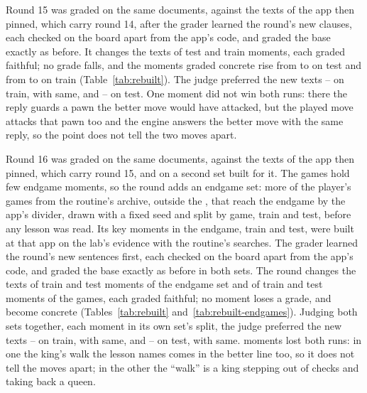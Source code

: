 \documentclass[11pt]{article}
\begin{document}
Round 15 was graded on the same documents, against the texts of the app then pinned, which carry round 14,
after the grader learned the round's new clauses, each checked on the board apart from the app's
code, and graded the base exactly as before. It changes the texts of \RoundFifteenChangedTest{}
test and \RoundFifteenChangedTrain{} train moments, each graded faithful; no grade falls, and the
moments graded concrete rise from \RoundFifteenConcreteBaseTest{} to \RoundFifteenConcreteTest{}
on test and from \RoundFifteenConcreteBaseTrain{} to \RoundFifteenConcreteTrain{} on train
(Table~\ref{tab:rebuilt}). The judge preferred the new texts
\RoundFifteenTrainNew--\RoundFifteenTrainOld{} on train, with \RoundFifteenTrainSame{} same, and
\RoundFifteenTestNew--\RoundFifteenTestOld{} on test. One moment did not win both runs: there the
reply guards a pawn the better move would have attacked, but the played move attacks that pawn too
and the engine answers the better move with the same reply, so the point does not tell the two
moves apart.

Round 16 was graded on the same documents, against the texts of the app then pinned, which carry round 15,
and on a second set built for it. The \Games{} games hold few endgame moments, so the round adds an
endgame set: \EndgameGames{} more of the player's games from the routine's archive, outside the
\Games, that reach the endgame by the app's divider, drawn with a fixed seed and split by game,
\EndgameGamesTrain{} train and \EndgameGamesTest{} test, before any lesson was read. Its key moments
in the endgame, \EndgameMomentsTrain{} train and \EndgameMomentsTest{} test, were built at that app
on the lab's evidence with the routine's searches. The grader learned the round's new
sentences first, each checked on the board apart from the app's code, and graded the base exactly
as before in both sets. The round changes the texts of \RoundSixteenChangedEndgameTrain{} train
and \RoundSixteenChangedEndgameTest{} test moments of the endgame set and of
\RoundSixteenChangedSixtyTrain{} train and \RoundSixteenChangedSixtyTest{} test moments of the
\Games{} games, each graded faithful; no moment loses a grade, and \RoundSixteenRose{} become
concrete (Tables~\ref{tab:rebuilt} and~\ref{tab:rebuilt-endgames}). Judging both sets together, each moment in its own set's
split, the judge preferred the new texts \RoundSixteenTrainNew--\RoundSixteenTrainOld{} on train,
with \RoundSixteenTrainSame{} same, and \RoundSixteenTestNew--\RoundSixteenTestOld{} on test, with
\RoundSixteenTestSame{} same. \RoundSixteenOldBothCap{} moments lost both runs: in one the king's
walk the lesson names comes in the better line too, so it does not tell the moves apart; in the
other the ``walk'' is a king stepping out of checks and taking back a queen.
\end{document}
